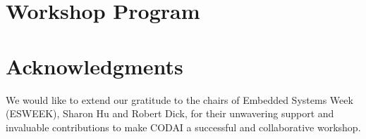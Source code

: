 \documentclass[sigconf]{acmart}
\begin{document}
\section{Workshop Program}

\section{Acknowledgments}
We would like to extend our gratitude to the chairs of Embedded Systems Week (ESWEEK), Sharon Hu and Robert Dick, for their unwavering support and invaluable contributions to make CODAI a successful and collaborative workshop.




\end{document}
